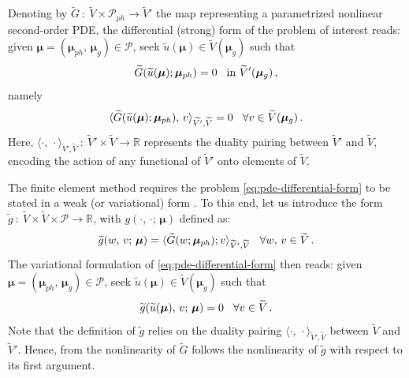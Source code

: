 \documentclass[12pt, a4paper, twoside, openright]{report}
\numberwithin{equation}{chapter}
\theoremstyle{theorem}
\theoremstyle{definition}
\theoremstyle{remark}
\theoremstyle{proposition}
\numberwithin{figure}{chapter}
\newcommand{\wt}[1]{\widetilde{#1}}
\newcommand{\bg}[1]{\boldsymbol{#1}}
\begin{document}
		Denoting by $\wt{G} ~ : ~ \wt{V} \times \mathcal{P}_{ph} \rightarrow \wt{V}'$ the map representing a parametrized nonlinear second-order PDE, the differential (strong) form of the problem of interest reads: given $\bg{\mu} = (\bg{\mu}_{ph}, \, \bg{\mu}_g) \in \mathcal{P}$, seek $\wt{u}(\boldsymbol{\mu}) \in \wt{V}(\bg{\mu}_g)$ such that
		\begin{equation}
			\label{eq:pde-differential-form}
			\wt{G}(\wt{u}(\bg{\mu}); \bg{\mu}_{ph}) = 0 \hspace*{0.3cm} \text{in $\wt{V}'(\bg{\mu}_g)$} \, ,
		\end{equation}
		namely
		\begin{equation*}
			\langle \wt{G}(\wt{u}(\bg{\mu}); \bg{\mu}_{ph}), \, v \rangle_{\wt{V'},\wt{V}} = 0 \hspace*{0.3cm} \forall v \in \wt{V}(\bg{\mu}_g) \, .
		\end{equation*}
		Here, $\langle \cdot, \, \cdot \rangle_{\wt{V}',\wt{V}} ~ : ~ \wt{V}' \times \wt{V} \rightarrow \mathbb{R}$ represents the duality pairing between $\wt{V}'$ and $\wt{V}$, encoding the action of any functional of $\wt{V}'$ onto elements of $\wt{V}$.
		
		The finite element method requires the problem \eqref{eq:pde-differential-form} to be stated in a weak (or variational) form \cite{Qua10}. To this end, let us introduce the form $\wt{g} ~ : ~ \wt{V} \times \wt{V} \times \mathcal{P} \rightarrow \mathbb{R}$, with $g(\cdot, \, \cdot; \, \bg{\mu})$ defined as:
		\begin{equation*}
			\wt{g}(w, \, v; \, \bg{\mu}) = \langle \wt{G}(w; \bg{\mu}_{ph}); v \rangle_{\wt{V}',\wt{V}} \hspace*{0.3cm} \forall w, \, v \in \wt{V} \, .
		\end{equation*}
		The variational formulation of \eqref{eq:pde-differential-form} then reads: given $\bg{\mu} = (\bg{\mu}_{ph}, \, \bg{\mu}_g) \in \mathcal{P}$, seek $\wt{u}(\bg{\mu}) \in \wt{V}(\bg{\mu}_g)$ such that
		\begin{equation}
			\label{eq:pde-variational-form}
			\wt{g}(\wt{u}(\bg{\mu}), \, v; \, \bg{\mu}) = 0 \hspace*{0.3cm} \forall v \in \wt{V} \, .
		\end{equation}
		Note that the definition of $\wt{g}$ relies on the duality pairing $\langle \cdot, \, \cdot \rangle_{\wt{V}',\wt{V}}$ between $\wt{V}$ and $\wt{V}'$. Hence, from the nonlinearity of $\wt{G}$ follows the nonlinearity of $\wt{g}$ with respect to its first argument.
		
\end{document}
